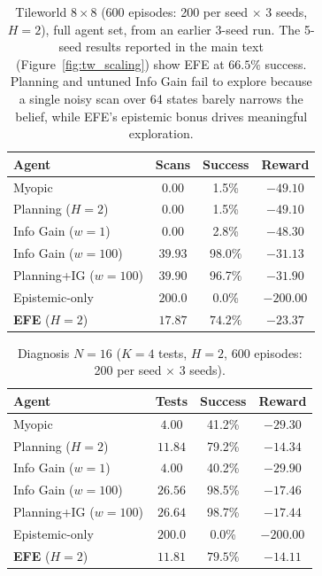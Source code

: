 \documentclass[runningheads]{llncs}
\begin{document}
\begin{table}[h]
\centering
\caption{Tileworld $8{\times}8$ (600 episodes: 200 per seed $\times$ 3 seeds, $H{=}2$), full agent set, from an earlier 3-seed run. The 5-seed results reported in the main text (Figure~\ref{fig:tw_scaling}) show EFE at $66.5\%$ success. Planning and untuned Info Gain fail to explore because a single noisy scan over 64 states barely narrows the belief, while EFE's epistemic bonus drives meaningful exploration.}
\begin{small}
\begin{tabular}{lccc}
\toprule
Agent & Scans & Success & Reward \\
\midrule
Myopic & $0.00$ & 1.5\% & $-49.10$ \\
Planning ($H{=}2$) & $0.00$ & 1.5\% & $-49.10$ \\
Info Gain ($w{=}1$) & $0.00$ & 2.8\% & $-48.30$ \\
Info Gain ($w{=}100$) & $39.93$ & 98.0\% & $-31.13$ \\
Planning+IG ($w{=}100$) & $39.90$ & 96.7\% & $-31.90$ \\
Epistemic-only & $200.0$ & 0.0\% & $-200.00$ \\
\textbf{EFE} ($H{=}2$) & $\mathbf{17.87}$ & $\mathbf{74.2\%}$ & $\mathbf{-23.37}$ \\
\bottomrule
\end{tabular}
\end{small}
\end{table}

\begin{table}[h]
\centering
\caption{Diagnosis $N{=}16$ ($K{=}4$ tests, $H{=}2$, 600 episodes: 200 per seed $\times$ 3 seeds).}
\begin{small}
\begin{tabular}{lccc}
\toprule
Agent & Tests & Success & Reward \\
\midrule
Myopic & $4.00$ & 41.2\% & $-29.30$ \\
Planning ($H{=}2$) & $11.84$ & 79.2\% & $-14.34$ \\
Info Gain ($w{=}1$) & $4.00$ & 40.2\% & $-29.90$ \\
Info Gain ($w{=}100$) & $26.56$ & 98.5\% & $-17.46$ \\
Planning+IG ($w{=}100$) & $26.64$ & 98.7\% & $-17.44$ \\
Epistemic-only & $200.0$ & 0.0\% & $-200.00$ \\
\textbf{EFE} ($H{=}2$) & $\mathbf{11.81}$ & $\mathbf{79.5\%}$ & $\mathbf{-14.11}$ \\
\bottomrule
\end{tabular}
\end{small}
\end{table}
\end{document}
